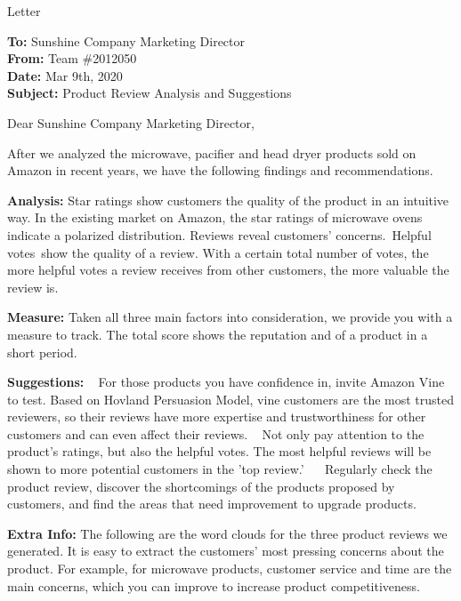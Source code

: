 \documentclass[12pt]{article}  %
\begin{document}
\begin{letter}{Letter}
\begin{flushleft}  %
\textbf{To:} Sunshine Company Marketing Director\\
\textbf{From:} Team \#2012050\\
\textbf{Date:} Mar 9th, 2020\\
\textbf{Subject:} Product Review Analysis and Suggestions
\end{flushleft}

Dear Sunshine Company Marketing Director,

After we analyzed the microwave, pacifier and head dryer products sold on Amazon in recent years, we have the following findings and recommendations.

\textbf{Analysis:} Star ratings show customers the quality of the product in an intuitive way. In the existing market on Amazon, the star ratings of microwave ovens indicate a polarized distribution. Reviews reveal customers' concerns. Helpful votes show the quality of a review. With a certain total number of votes, the more helpful votes a review receives from other customers, the more valuable the review is.

\textbf{Measure:} Taken all three main factors into consideration, we provide you with a measure to track. The total score shows the reputation and of a product in a short period.

\textbf{Suggestions:}
~ For those products you have confidence in, invite Amazon Vine to test. Based on Hovland Persuasion Model, vine customers are the most trusted reviewers, so their reviews have more expertise and trustworthiness for other customers and can even affect their reviews.
~ Not only pay attention to the product's ratings, but also the helpful votes. The most helpful reviews will be shown to more potential customers in the 'top review.' 
~ Regularly check the product review, discover the shortcomings of the products proposed by customers, and find the areas that need improvement to upgrade products.

\textbf{Extra Info:} The following are the word clouds for the three product reviews we generated. It is easy to extract the customers' most pressing concerns about the product. For example, for microwave products, customer service and time are the main concerns, which you can improve to increase product competitiveness.


\end{letter}
\end{document}
